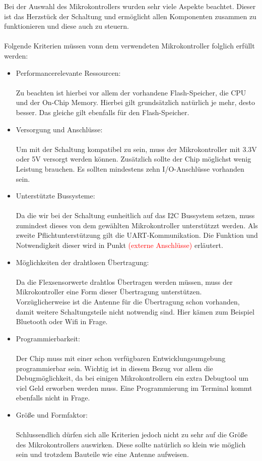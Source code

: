 \documentclass[11pt]{article}
\begin{document}
Bei der Auswahl des Mikrokontrollers wurden sehr viele Aspekte beachtet. Dieser ist das Herzstück der Schaltung und ermöglicht
allen Komponenten zusammen zu funktionieren und diese auch zu steuern. \\
\\
Folgende Kriterien müssen vonn dem verwendeten Mikrokontroller folglich erfüllt werden:
\begin{itemize}
	\item Performancerelevante Ressourcen: \\
		  \\
		  Zu beachten ist hierbei vor allem der vorhandene Flash-Speicher, die CPU und der On-Chip Memory. Hierbei gilt grundsätzlich 
		  natürlich je mehr, desto besser. Das gleiche gilt ebenfalls für den Flash-Speicher.
	\item Versorgung und Anschlüsse: \\
		  \\
		  Um mit der Schaltung kompatibel zu sein, muss der Mikrokontroller mit 3.3V oder 5V versorgt werden können. Zusätzlich
		  sollte der Chip möglichst wenig Leistung brauchen. Es sollten mindestens zehn I/O-Anschlüsse vorhanden sein.
	\item Unterstützte Bussysteme: \\
		  \\
		  Da die wir bei der Schaltung eunheitlich auf das I2C Bussystem setzen, muss zumindest dieses von dem gewählten Mikrokontroller
		  unterstützzt werden. Als zweite Pflichtunterstützung gilt die UART-Kommunikation. Die Funktion und Notwendigkeit dieser
		  wird in Punkt \textcolor{red}{(externe Anschlüsse)} erläutert.
	\item Möglichkeiten der drahtlosen Übertragung: \\
		  \\
		  Da die Flexsensorwerte drahtlos Übertragen werden müssen, muss der Mikrokontroller eine Form dieser Übertragung unterstützen.
		  Vorzüglicherweise ist die Antenne für die Übertragung schon vorhanden, damit weitere Schaltungsteile nicht notwendig sind.
		  Hier kämen zum Beispiel Bluetooth oder Wifi in Frage.
	\item Programmierbarkeit: \\
		  \\
		  Der Chip muss mit einer schon verfügbaren Entwicklungsumgebung programmierbar sein. Wichtig ist in diesem Bezug vor allem
		  die Debugmöglichkeit, da bei einigen Mikrokontrollern ein extra Debugtool um viel Geld erworben werden muss. Eine Programmierung
		  im Terminal kommt ebenfalls nicht in Frage.
	\item Größe und Formfaktor: \\
		  \\
		  Schlussendlich dürfen sich alle Kriterien jedoch nicht zu sehr auf die Größe des Mikrokontrollers auswirken. Diese sollte
		  natürlich so klein wie möglich sein und trotzdem Bauteile wie eine Antenne aufweisen.
\end{itemize}
\end{document}
